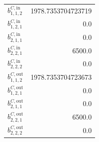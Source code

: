 \documentclass{article}%
\begin{document}
\begin{multicols*}{3}
\begin{supertabular}{lr}
	$b_{1,1,2}^{C,\text{in}}$ & 1978.7353704723719 \\%
	$b_{1,2,1}^{C,\text{in}}$ & 0.0 \\%
	$b_{2,1,1}^{C,\text{in}}$ & 0.0 \\%
	$b_{2,2,1}^{C,\text{in}}$ & 6500.0 \\%
	$b_{2,2,2}^{C,\text{in}}$ & 0.0 \\%
	$b_{1,1,2}^{C,\text{out}}$ & 1978.7353704723673 \\%
	$b_{1,2,1}^{C,\text{out}}$ & 0.0 \\%
	$b_{2,1,1}^{C,\text{out}}$ & 0.0 \\%
	$b_{2,2,1}^{C,\text{out}}$ & 6500.0 \\%
	$b_{2,2,2}^{C,\text{out}}$ & 0.0 \\%
\end{supertabular}%
\end{multicols*}%
\end{document}
